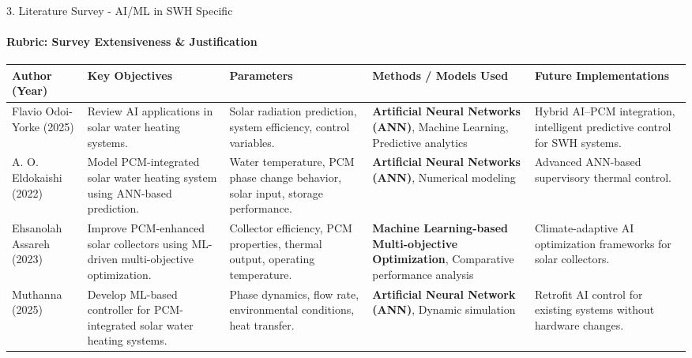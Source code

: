 \documentclass[aspectratio=169, 11pt]{beamer}
\begin{document}
\begin{frame}{3. Literature Survey - AI/ML in SWH Specific}
\framesubtitle{Rubric: Survey Extensiveness \& Justification}
\tiny
\renewcommand{\arraystretch}{1.5}
\begin{table}
\centering
\begin{tabular}{|p{1.6cm}|p{3.0cm}|p{2.8cm}|p{3.0cm}|p{3.0cm}|}
\hline
\textbf{Author (Year)} &
\textbf{Key Objectives} &
\textbf{Parameters} &
\textbf{Methods / Models Used} &
\textbf{Future Implementations} \\
\hline
Flavio Odoi-Yorke (2025) \cite{OdoiYorke2025AI_SWH} &
Review AI applications in solar water heating systems. &
Solar radiation prediction, system efficiency, control variables. &
\textbf{Artificial Neural Networks (ANN)}, Machine Learning, Predictive analytics &
Hybrid AI--PCM integration, intelligent predictive control for SWH systems. \\
\hline
A. O. Eldokaishi (2022) \cite{Eldokaishi2022ANN_PCM_SWH} &
Model PCM-integrated solar water heating system using ANN-based prediction. &
Water temperature, PCM phase change behavior, solar input, storage performance. &
\textbf{Artificial Neural Networks (ANN)}, Numerical modeling &
Advanced ANN-based supervisory thermal control. \\
\hline

Ehsanolah Assareh (2023) \cite{Assareh2023ML_PCM_SolarCollector} &
Improve PCM-enhanced solar collectors using ML-driven multi-objective optimization. &
Collector efficiency, PCM properties, thermal output, operating temperature. &
\textbf{Machine Learning-based Multi-objective Optimization}, Comparative performance analysis &
Climate-adaptive AI optimization frameworks for solar collectors. \\
\hline 

Muthanna (2025) \cite{MJET2025PCM} &
Develop ML-based controller for PCM-integrated solar water heating systems. &
Phase dynamics, flow rate, environmental conditions, heat transfer. &
\textbf{Artificial Neural Network (ANN)}, Dynamic simulation &
Retrofit AI control for existing systems without hardware changes. \\
\hline
\end{tabular}
\end{table}
\end{frame}
\end{document}
